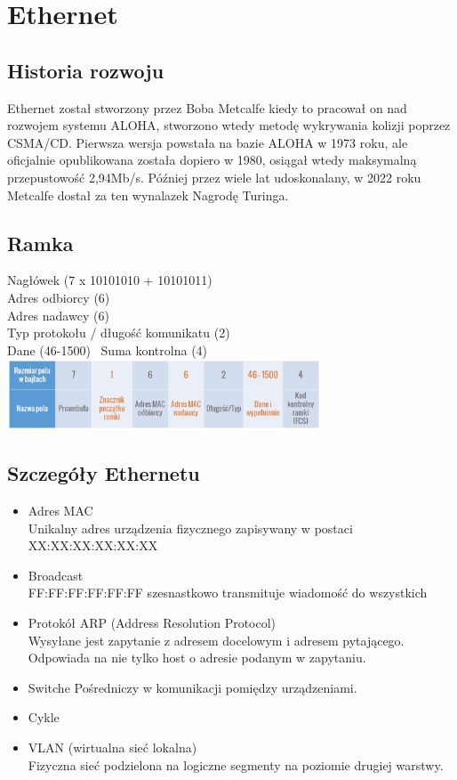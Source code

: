 \documentclass[]{article}
\begin{document}
\section {Ethernet}
\subsection{Historia rozwoju}
Ethernet został stworzony przez Boba Metcalfe kiedy to pracował on nad rozwojem systemu ALOHA, stworzono wtedy metodę wykrywania kolizji poprzez CSMA/CD. Pierwsza wersja powstała na bazie ALOHA w 1973 roku, ale oficjalnie opublikowana została dopiero w 1980, osiągał wtedy maksymalną przepustowość 2,94Mb/s. Później przez wiele lat udoskonalany, w 2022 roku Metcalfe dostał za ten wynalazek Nagrodę Turinga.
\subsection{Ramka}
Nagłówek (7 x 10101010 + 10101011) \\
Adres odbiorcy (6) \\
Adres nadawcy (6) \\
Typ protokołu / długość komunikatu (2) \\
Dane (46-1500) \ 
Suma kontrolna (4) \\
\includegraphics[width=0.7\textwidth]{ramka-ethernetowa.jpg}
\subsection{Szczegóły Ethernetu}
\begin{itemize}
    \item Adres MAC \\
    Unikalny adres urządzenia fizycznego zapisywany w postaci XX:XX:XX:XX:XX:XX
    \item Broadcast \\
    FF:FF:FF:FF:FF:FF szesnastkowo transmituje wiadomość do wszystkich
    \item Protokół ARP (Address Resolution Protocol) \\
    Wysyłane jest zapytanie z adresem docelowym i adresem pytającego. Odpowiada na nie tylko host o adresie podanym w zapytaniu.
    \item Switche
    Pośredniczy w komunikacji pomiędzy urządzeniami.
    \item Cykle
    \item VLAN (wirtualna sieć lokalna) \\
    Fizyczna sieć podzielona na logiczne segmenty na poziomie drugiej warstwy.
\end{itemize}
\end{document}
